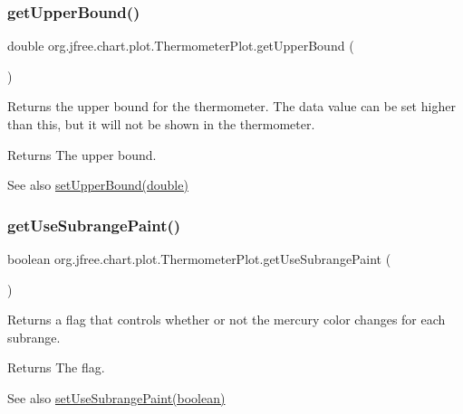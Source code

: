 \subsubsection{\texorpdfstring{get\+Upper\+Bound()}{getUpperBound()}}
{\footnotesize\ttfamily double org.\+jfree.\+chart.\+plot.\+Thermometer\+Plot.\+get\+Upper\+Bound (\begin{DoxyParamCaption}{ }\end{DoxyParamCaption})}

Returns the upper bound for the thermometer. The data value can be set higher than this, but it will not be shown in the thermometer.

\begin{DoxyReturn}{Returns}
The upper bound.
\end{DoxyReturn}
\begin{DoxySeeAlso}{See also}
\mbox{\hyperlink{classorg_1_1jfree_1_1chart_1_1plot_1_1_thermometer_plot_a1a73cf46d74888646303ea48f4dce694}{set\+Upper\+Bound(double)}} 
\end{DoxySeeAlso}
\mbox{\label{classorg_1_1jfree_1_1chart_1_1plot_1_1_thermometer_plot_a315ab774d4acc16d2256da66c3a427b0}} 
\subsubsection{\texorpdfstring{get\+Use\+Subrange\+Paint()}{getUseSubrangePaint()}}
{\footnotesize\ttfamily boolean org.\+jfree.\+chart.\+plot.\+Thermometer\+Plot.\+get\+Use\+Subrange\+Paint (\begin{DoxyParamCaption}{ }\end{DoxyParamCaption})}

Returns a flag that controls whether or not the mercury color changes for each subrange.

\begin{DoxyReturn}{Returns}
The flag.
\end{DoxyReturn}
\begin{DoxySeeAlso}{See also}
\mbox{\hyperlink{classorg_1_1jfree_1_1chart_1_1plot_1_1_thermometer_plot_a042ea3581fd39e5ba42636c02b37c50d}{set\+Use\+Subrange\+Paint(boolean)}} 
\end{DoxySeeAlso}
\mbox{\label{classorg_1_1jfree_1_1chart_1_1plot_1_1_thermometer_plot_abeef2f4f04d40d398218553181a766c0}} 
